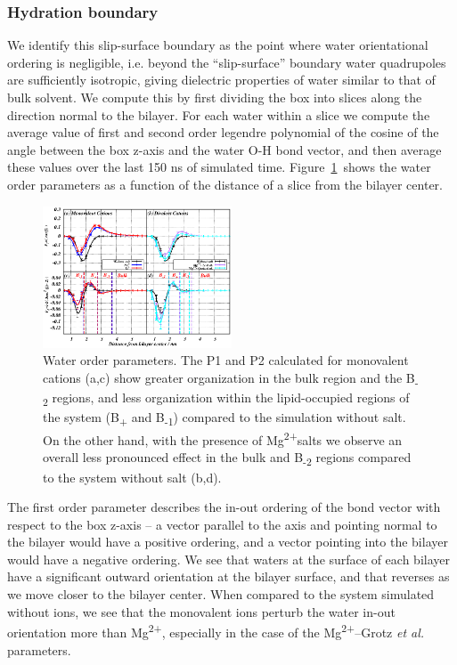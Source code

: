 \documentclass[12pt,openany,final]{book}
\newcommand{\etal}{\textit{et al.}}
\newcommand{\mg}{Mg\textsuperscript{2+}}
\newcommand{\mgmicro}{Mg\textsuperscript{2+}--Grotz \etal}
\begin{document}
\subsubsection{Hydration boundary}
We {identify} this 
slip-surface boundary as the point where 
water orientational ordering is negligible, i.e.
beyond the ``slip-surface'' 
boundary water {quadrupoles} are {sufficiently isotropic,
giving dielectric properties of water similar to that of bulk solvent}.
We compute this by first dividing the box into 
slices along the direction normal to the bilayer. 
For each water within a slice we 
compute the average value of first and second order legendre polynomial of 
the cosine of the angle between the box z-axis and
the water O-H bond vector, and then average these values over the last 150 ns of simulated time.
Figure~\ref{fig:h2order:ch2}~shows the water order parameters 
as a function of the distance of a slice from the bilayer center.
\begin{figure}
    \caption[Water orientational order parameters]{Water order parameters.   
        {The P1 and P2 calculated for monovalent cations (a,c) show greater 
            organization in the bulk region and the B\textsubscript{-2} regions, and less organization within 
            the lipid-occupied regions of the system (B\textsubscript{+} and B\textsubscript{-1}) compared to the simulation without salt. 
        } 
{On the other hand, with the presence of \mg salts we observe an overall less pronounced effect in the
bulk and B\textsubscript{-2} regions compared to the system without salt (b,d).}
}
    
    \label{fig:h2order:ch2}
    \includegraphics[width=0.5\textwidth]{Figure_3_ch2.eps}
\end{figure}

The first order parameter describes the in-out ordering of the bond vector with respect to the 
box z-axis -- a vector parallel to the axis and pointing normal to the bilayer would have a positive
ordering, and a vector pointing into the bilayer would have a negative ordering. We see that waters at the surface
of each bilayer have a significant outward orientation at the bilayer surface, and that reverses as we move
closer to the bilayer center. When compared to the system simulated without ions, we see that
the monovalent ions perturb the water in-out orientation 
more than Mg\textsuperscript{2+}, especially in the case of the \mgmicro
parameters.
\end{document}
